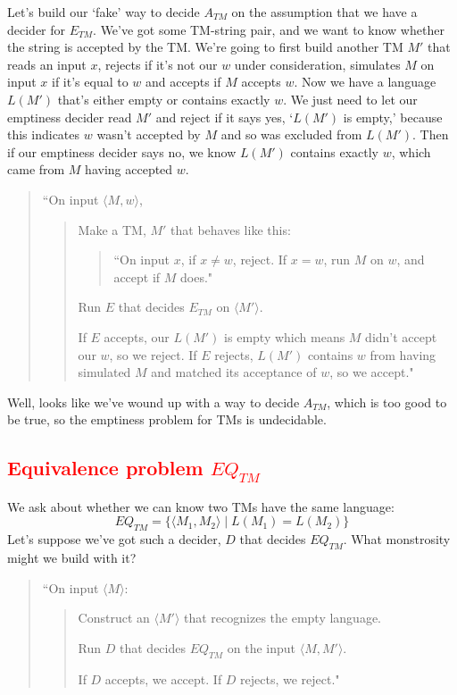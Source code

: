 \documentclass[11pt]{article}
\begin{document}
Let's build our `fake' way to decide $A_{TM}$ on the assumption that we have a decider for $E_{TM}$. We've got some TM-string pair, and we want to know whether the string is accepted by the TM. We're going to first build another TM $M'$ that reads an input $x$, rejects if it's not our $w$ under consideration, simulates $M$ on input $x$ if it's equal to $w$ and accepts if $M$ accepts $w$. Now we have a language $L(M')$ that's either empty or contains exactly $w$. We just need to let our emptiness decider read $M'$ and reject if it says yes, `$L(M')$ is empty,' because this indicates $w$ wasn't accepted by $M$ and so was excluded from $L(M')$. Then if our emptiness decider says no, we know $L(M')$ contains exactly $w$, which came from $M$ having accepted $w$.
\begin{quote}
``On input $\langle M, w \rangle$, 
\begin{quote} 
Make a TM, $M'$ that behaves like this:
\begin{quote}
``On input $x$, if $x \neq w$, reject. If $x = w$, run $M$ on $w$, and accept if $M$ does."
\end{quote}
Run $E$ that decides $E_{TM}$ on $\langle M' \rangle$.

If $E$ accepts, our $L(M')$ is empty which means $M$ didn't accept our $w$, so we reject. If $E$ rejects, $L(M')$ contains $w$ from having simulated $M$ and matched its acceptance of $w$, so we accept."
\end{quote}
\end{quote}
Well, looks like we've wound up with a way to decide $A_{TM}$, which is too good to be true, so the emptiness problem for TMs is undecidable.

\subsection{\textcolor{red}{Equivalence problem $EQ_{TM}$}}
We ask about whether we can know two TMs have the same language:
\[EQ_{TM} = \{\langle M_1, M_2 \rangle \mid L(M_1) = L(M_2)\}\]
Let's suppose we've got such a decider, $D$ that decides $EQ_{TM}$. What monstrosity might we build with it?

\begin{quote}
``On input $\langle M \rangle$:
\begin{quote}
Construct an $\langle M' \rangle$ that recognizes the empty language.

Run $D$ that decides $EQ_{TM}$ on the input $\langle M, M' \rangle$.

If $D$ accepts, we accept. If $D$ rejects, we reject."
\end{quote}
\end{quote}
\end{document}

